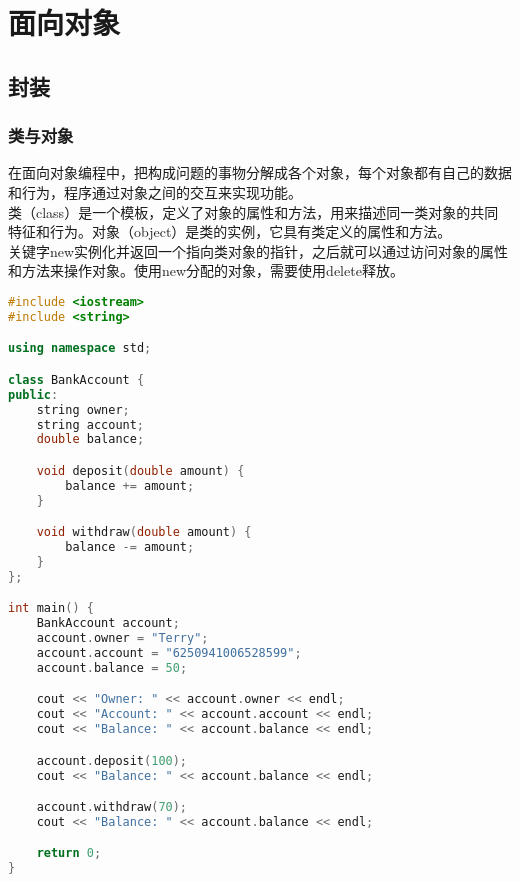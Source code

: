 \chapter{面向对象}

\section{封装}

\subsection{类与对象}

在面向对象编程中，把构成问题的事物分解成各个对象，每个对象都有自己的数据和行为，程序通过对象之间的交互来实现功能。\\

类（class）是一个模板，定义了对象的属性和方法，用来描述同一类对象的共同特征和行为。对象（object）是类的实例，它具有类定义的属性和方法。\\

关键字new实例化并返回一个指向类对象的指针，之后就可以通过访问对象的属性和方法来操作对象。使用new分配的对象，需要使用delete释放。\\


\begin{lstlisting}[language=C++]
#include <iostream>
#include <string>

using namespace std;

class BankAccount {
public:
    string owner;
    string account;
    double balance;

    void deposit(double amount) {
        balance += amount;
    }

    void withdraw(double amount) {
        balance -= amount;
    }
};

int main() {
    BankAccount account;
    account.owner = "Terry";
    account.account = "6250941006528599";
    account.balance = 50;

    cout << "Owner: " << account.owner << endl;
    cout << "Account: " << account.account << endl;
    cout << "Balance: " << account.balance << endl;

    account.deposit(100);
    cout << "Balance: " << account.balance << endl;

    account.withdraw(70);
    cout << "Balance: " << account.balance << endl;

    return 0;
}
\end{lstlisting}

